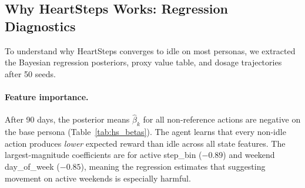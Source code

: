 \documentclass[11pt]{article}
\begin{document}
\subsection{Why HeartSteps Works: Regression Diagnostics}

To understand why HeartSteps converges to idle on most personas, we extracted the Bayesian regression posteriors, proxy value table, and dosage trajectories after 50 seeds.

\paragraph{Feature importance.}
After 90 days, the posterior means $\hat{\beta}_k$ for all non-reference actions are negative on the base persona (Table~\ref{tab:hs_betas}). The agent learns that every non-idle action produces \emph{lower} expected reward than idle across all state features. The largest-magnitude coefficients are for active step\_bin ($-0.89$) and weekend day\_of\_week ($-0.85$), meaning the regression estimates that suggesting movement on active weekends is especially harmful.
\end{document}

